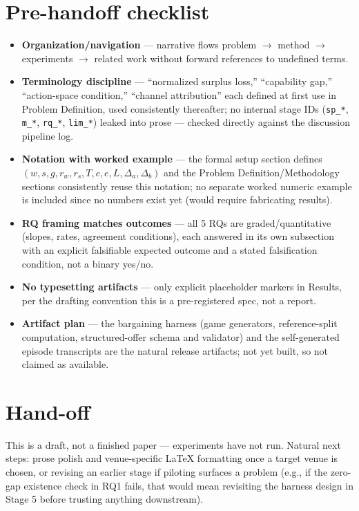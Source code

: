 \documentclass[11pt]{article}
\begin{document}
\section*{Pre-handoff checklist}
\begin{itemize}[leftmargin=1.4em]
\item \textbf{Organization/navigation} --- narrative flows problem $\to$ method $\to$ experiments $\to$ related work without forward references to undefined terms.
\item \textbf{Terminology discipline} --- ``normalized surplus loss,'' ``capability gap,'' ``action-space condition,'' ``channel attribution'' each defined at first use in Problem Definition, used consistently thereafter; no internal stage IDs (\texttt{sp\_*}, \texttt{m\_*}, \texttt{rq\_*}, \texttt{lim\_*}) leaked into prose --- checked directly against the discussion pipeline log.
\item \textbf{Notation with worked example} --- the formal setup section defines $(w, s, g, r_w, r_s, T, c, e, L, \Delta_a, \Delta_b)$ and the Problem Definition/Methodology sections consistently reuse this notation; no separate worked numeric example is included since no numbers exist yet (would require fabricating results).
\item \textbf{RQ framing matches outcomes} --- all 5 RQs are graded/quantitative (slopes, rates, agreement conditions), each answered in its own subsection with an explicit falsifiable expected outcome and a stated falsification condition, not a binary yes/no.
\item \textbf{No typesetting artifacts} --- only explicit placeholder markers in Results, per the drafting convention this is a pre-registered spec, not a report.
\item \textbf{Artifact plan} --- the bargaining harness (game generators, reference-split computation, structured-offer schema and validator) and the self-generated episode transcripts are the natural release artifacts; not yet built, so not claimed as available.
\end{itemize}

\section*{Hand-off}
This is a draft, not a finished paper --- experiments have not run. Natural next steps: prose polish and venue-specific LaTeX formatting once a target venue is chosen, or revising an earlier stage if piloting surfaces a problem (e.g., if the zero-gap existence check in RQ1 fails, that would mean revisiting the harness design in Stage 5 before trusting anything downstream).



\end{document}
